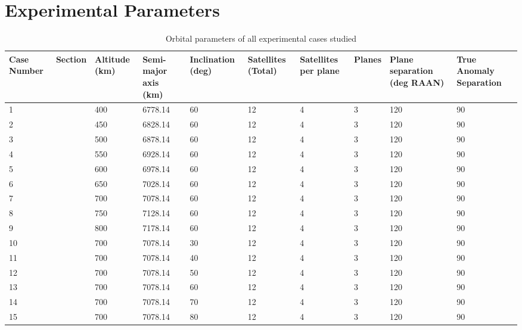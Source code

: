 \section{Experimental Parameters}
\label{app:all_parameters}
\begin{table}[htbp]
	\tiny
  \centering
  \caption{Orbital parameters of all experimental cases studied}
    \begin{tabular}{p{1cm}lp{1cm}p{12mm}p{10mm}p{10mm}p{1cm}lp{1cm}p{1cm}}
    \toprule
    Case Number & Section & Altitude (km) & Semi-major axis (km) & Inclination (deg) & Satellites (Total) &Satellites per plane & Planes & Plane separation (deg RAAN) & True Anomaly Separation \\
    \midrule
    1     &       & 400   & 6778.14 & 60    & 12    & 4     & 3     & 120   & 90 \\
    2     &       & 450   & 6828.14 & 60    & 12    & 4     & 3     & 120   & 90 \\
    3     &       & 500   & 6878.14 & 60    & 12    & 4     & 3     & 120   & 90 \\
    4     &       & 550   & 6928.14 & 60    & 12    & 4     & 3     & 120   & 90 \\
    5     &       & 600   & 6978.14 & 60    & 12    & 4     & 3     & 120   & 90 \\
    6     &       & 650   & 7028.14 & 60    & 12    & 4     & 3     & 120   & 90 \\
    7     &       & 700   & 7078.14 & 60    & 12    & 4     & 3     & 120   & 90 \\
    8     &       & 750   & 7128.14 & 60    & 12    & 4     & 3     & 120   & 90 \\
    9     &       & 800   & 7178.14 & 60    & 12    & 4     & 3     & 120   & 90 \\
    10    &       & 700   & 7078.14 & 30    & 12    & 4     & 3     & 120   & 90 \\
    11    &       & 700   & 7078.14 & 40    & 12    & 4     & 3     & 120   & 90 \\
    12    &       & 700   & 7078.14 & 50    & 12    & 4     & 3     & 120   & 90 \\
    13    &       & 700   & 7078.14 & 60    & 12    & 4     & 3     & 120   & 90 \\
    14    &       & 700   & 7078.14 & 70    & 12    & 4     & 3     & 120   & 90 \\
    15    &       & 700   & 7078.14 & 80    & 12    & 4     & 3     & 120   & 90 \\

\end{tabular}
\end{table}
